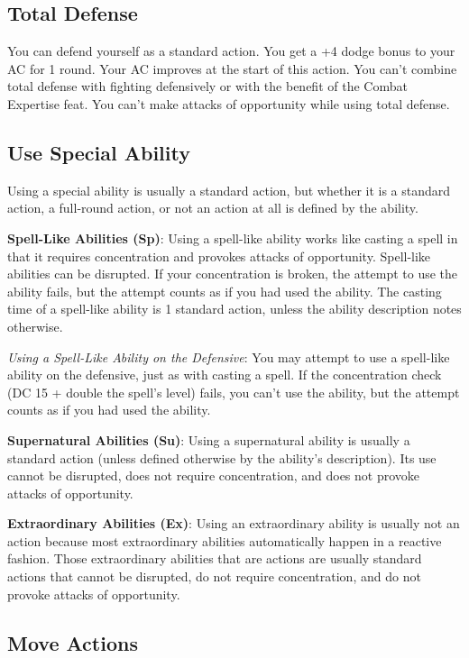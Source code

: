 \subsection{Total Defense}

				
You can defend yourself as a standard action. You get a +4 dodge bonus to your AC for 1 round. Your AC improves at the start of this action. You can't combine total defense with fighting defensively or with the benefit of the Combat Expertise feat. You can't make attacks of opportunity while using total defense.
				
\subsection{Use Special Ability}

				
Using a special ability is usually a standard action, but whether it is a standard action, a full-round action, or not an action at all is defined by the ability.
				
\textbf{Spell-Like Abilities (Sp)}: Using a spell-like ability works like casting a spell in that it requires concentration and provokes attacks of opportunity. Spell-like abilities can be disrupted. If your concentration is broken, the attempt to use the ability fails, but the attempt counts as if you had used the ability. The casting time of a spell-like ability is 1 standard action, unless the ability description notes otherwise.
				
\textit{Using a Spell-Like Ability on the Defensive}: You may attempt to use a spell-like ability on the defensive, just as with casting a spell. If the concentration check (DC 15 + double the spell's level) fails, you can't use the ability, but the attempt counts as if you had used the ability.
				
\textbf{Supernatural Abilities (Su)}: Using a supernatural ability is usually a standard action (unless defined otherwise by the ability's description). Its use cannot be disrupted, does not require concentration, and does not provoke attacks of opportunity.
				
\textbf{Extraordinary Abilities (Ex)}: Using an extraordinary ability is usually not an action because most extraordinary abilities automatically happen in a reactive fashion. Those extraordinary abilities that are actions are usually standard actions that cannot be disrupted, do not require concentration, and do not provoke attacks of opportunity.
				
\subsection{Move Actions}

